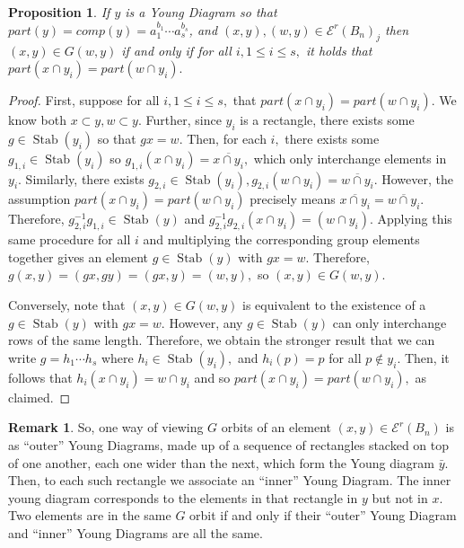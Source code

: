 \documentclass[10 pt]{amsart}
\theoremstyle{plain}
\newtheorem{prop}[thm]{Proposition}
\theoremstyle{definition}
\newtheorem{rem}[thm]{Remark}
\theoremstyle{remark}
\numberwithin{equation}{section}
\def\Stab{\operatorname{Stab}}
\begin{document}
\begin{prop}
\label{prop:wreath_orbits}
If $y$ is a Young Diagram so that $part(y) = comp(y) =a_1^{b_1}\cdots a_s^{b_s}$, and $(x, y), (w, y) \in\mathcal E^r(B_n)_j$ then $(x, y) \in G(w, y)$ if and only if for all $i,1 \leq i \leq s,$ it holds that $part(x\cap y_i) = part(w \cap y_i).$
\end{prop}
\begin{proof}
First, suppose for all $i,1 \leq i \leq s,$ that $part(x\cap y_i) = part(w\cap y_i).$ We know both $x\subset y, w \subset y$. Further, since $y_i$ is a rectangle, there exists some $g \in \Stab(y_i)$ so that $gx = w.$ Then, for each $i,$ there exists some $g_{1,i} \in \Stab(y_i)$ so $g_{1,i}(x \cap y_i)=\overline{x \cap y_i},$ which only interchange elements in $y_i.$ Similarly, there exists $g_{2,i} \in \Stab(y_i),g_{2,i}(w \cap y_i) = \overline{w\cap y_i}.$ However, the assumption $part(x\cap y_i) = part(w\cap y_i)$ precisely means $\overline{x \cap y_i}= \overline{w\cap y_i}.$ Therefore, $g_{2,i}^{-1}g_{1,i} \in \Stab(y)$ and $g_{2,i}^{-1}g_{2,i}(x \cap y_i) = (w \cap y_i).$ Applying this same procedure for all $i$ and multiplying the corresponding group elements together gives an element $g \in \Stab(y)$ with $gx = w.$ Therefore, $g(x, y) = (gx, gy) = (gx, y) = (w, y),$ so $(x, y) \in G(w, y).$

Conversely, note that $(x, y) \in G(w, y)$ is equivalent to the existence of a $g \in \Stab(y)$ with $gx = w.$ However, any $g \in \Stab(y)$ can only interchange rows of the same length. Therefore, we obtain the stronger result that we can write $g = h_1 \cdots h_s$ where $h_i \in \Stab(y_i),$ and $h_i(p) = p$ for all $p \notin y_i.$ Then, it follows that $h_i(x \cap y_i) = w \cap y_i$ and so $part(x\cap y_i) = part(w\cap y_i),$ as claimed.
\end{proof}

\begin{rem}
So, one way of viewing $G$ orbits of an element $(x, y) \in \mathcal E^r(B_n)$ is as ``outer'' Young Diagrams, made up of a sequence of rectangles stacked on top of one another, each one wider than the next, which form the Young diagram $\bar y.$ Then, to each such rectangle we associate an ``inner'' Young Diagram. The inner young diagram corresponds to the elements in that rectangle in $y$ but not in $x.$ Two elements are in the same $G$ orbit if and only if their ``outer'' Young Diagram and ``inner'' Young Diagrams are all the same.
\end{rem}
\end{document}

